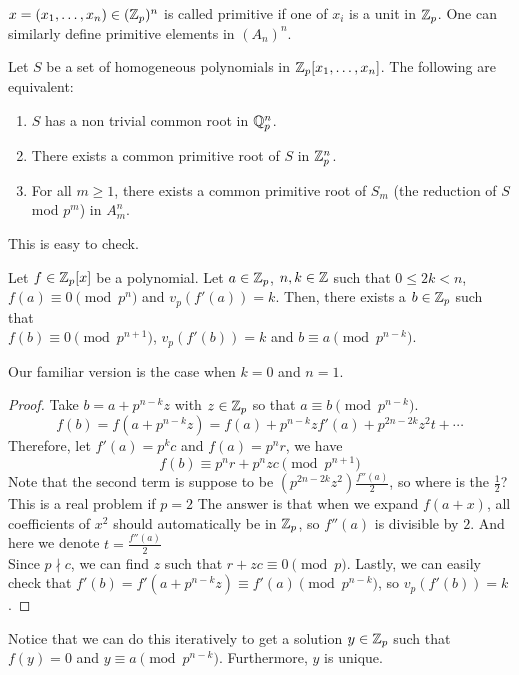 \documentclass[15pt]{scrartcl}
\begin{document}
\begin{definition}
    $x=(x_1, \ldots, x_n)\in (\mathbb Z_p)^n$ is called primitive if one of $x_i$ is a unit in $\mathbb Z_p$. One can similarly define primitive elements in $(A_n)^n$.
\end{definition}
\begin{theorem}
    Let $S$ be a set of homogeneous polynomials in $\mathbb Z_p[x_1,\ldots,x_n]$. The following are equivalent:
    \begin{enumerate}
        \item $S$ has a non trivial common root in $\mathbb Q_p^n$.
        \item There exists a common primitive root of $S$ in $\mathbb Z_p^n$. 
        \item For all $m\geq 1$, there exists a common primitive root of $S_m$ (the reduction of $S$ mod $p^m$) in $A_m^n$.
    \end{enumerate}
\end{theorem}
This is easy to check. 
\begin{lemma}
    Let $f\in \mathbb Z_p[x]$ be a polynomial. Let $a\in \mathbb Z_p$, $n, k\in \mathbb Z$ such that $0\leq 2k <n$, $f(a)\equiv 0\pmod{p^n}$ and $v_p(f'(a))=k$. Then, there exists a  $b\in \mathbb Z_p$ such that 
    \\
    $f(b)\equiv 0\pmod{p^{n+1}}$, $v_p(f'(b))=k$ and $b\equiv a\pmod{p^{n-k}}$.
\end{lemma}
Our familiar version is the case when $k=0$ and $n=1$. 
\begin{proof}
    Take $b=a+p^{n-k}z$ with $z\in \mathbb Z_p$ so that $a\equiv b \pmod{p^{n-k}}$. 
    \[f(b)=f(a+p^{n-k}z)=f(a)+p^{n-k}zf'(a)+ p^{2n-2k}z^2t+\cdots\]
Therefore, let $f'(a)=p^kc$ and $f(a)=p^nr$, we have
\[f(b)\equiv p^nr+p^nzc\pmod{p^{n+1}}\]
Note that the second term is suppose to be $(p^{2n-2k}z^2)\frac{f''(a)}{2}$, so where is the $\frac{1}{2}$? This is a real problem if $p=2$ The answer is that when we expand $f(a+x)$, all coefficients of $x^2$ should automatically be in $\mathbb Z_p$, so $f''(a)$ is divisible by $2$. And here we denote $t=\frac{f''(a)}{2}$
\\

Since $p\nmid c$, we can find $z$ such that $r+zc\equiv 0\pmod{p}$. Lastly, we can easily check that $f'(b)=f'(a+p^{n-k}z)\equiv f'(a)\pmod{p^{n-k}}$, so $v_p(f'(b))=k$.
\end{proof}
\begin{remark}
    Notice that we can do this iteratively to get a solution $y\in \mathbb Z_p$ such that $f(y)=0$ and $y\equiv a \pmod{p^{n-k}}$. Furthermore, $y$ is unique. 
\end{remark}
\end{document}
